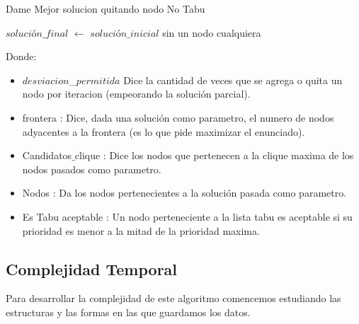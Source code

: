 \begin{algorithm}[H]
    \SetAlgoLined
    \caption{Dame Mejor solucion quitando nodo No Tabu}

	$solución\_final$ $\leftarrow$ $solución\_inicial$ sin un nodo cualquiera \\

\end{algorithm}

Donde:
\begin{itemize}
 \item $desviacion$\_$permitida$ Dice la cantidad de veces que se agrega o quita un nodo por iteracion (empeorando la solución parcial).
 \item frontera : Dice, dada una solución como parametro, el numero de nodos adyacentes a la frontera (es lo que pide maximizar el enunciado).
 \item Candidatos$\_$clique : Dice los nodos que pertenecen a la clique maxima de los nodos pasados como parametro.
 \item Nodos : Da los nodos pertenecientes a la solución pasada como parametro.
 \item Es Tabu aceptable : Un nodo perteneciente a la lista tabu es aceptable si su prioridad es menor a la mitad de la prioridad maxima.
\end{itemize}

\subsection{Complejidad Temporal}

 Para desarrollar la complejidad de este algoritmo comencemos estudiando las estructuras y las formas en las que guardamos los datos. \newline

